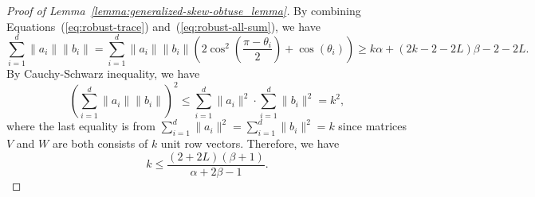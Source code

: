 \begin{proof}[Proof of Lemma~\ref{lemma:generalized-skew-obtuse_lemma}]
    By combining Equations~(\ref{eq:robust-trace}) and~(\ref{eq:robust-all-sum}), we have 
    $$
    \sum_{i=1}^d \|a_i\|\|b_i\| = \sum_{i=1}^d \|a_i\|\|b_i\| \left(2\cos^2\left(\frac{\pi-\theta_i}{2}\right) + \cos(\theta_i)\right) \geq k\alpha+(2k-2-2L)\beta -2 - 2L.
    $$
    By Cauchy-Schwarz inequality, we have 
    $$
    \left(\sum_{i=1}^d \|a_i\|\|b_i\| \right)^2 \leq \sum_{i=1}^d \|a_i\|^2 \cdot \sum_{i=1}^d \|b_i\|^2 = k^2,
    $$
    where the last equality is from $\sum_{i=1}^d \|a_i\|^2 = \sum_{i=1}^d \|b_i\|^2 = k$ since matrices $V$ and $W$ are both consists of $k$ unit row vectors. Therefore, we have 
    $$
    k \leq \frac{(2+2L)(\beta+1)}{\alpha + 2\beta-1}.
    $$

\end{proof}

